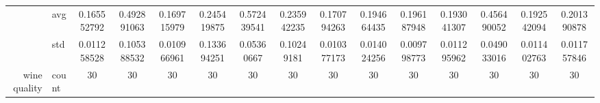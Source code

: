 \begin{table}[H]
{\begin{tabular}{rlccc|c|c|c|c|c|ccccc}
			                                                                               & avg                & \cellcolor[rgb]{ .388,  .745,  .482}\textcolor[rgb]{ 0,  .38,  0}{0.165552792} & \cellcolor[rgb]{ .98,  .522,  .443}0.492891063                                 & \cellcolor[rgb]{ .471,  .769,  .486}0.169715979                                & \cellcolor[rgb]{ 1,  .855,  .506}0.245419875    & \cellcolor[rgb]{ .973,  .412,  .42}0.572439541                                 & \cellcolor[rgb]{ 1,  .871,  .51}0.235942235     & \cellcolor[rgb]{ .49,  .773,  .486}0.170794263                                 & \cellcolor[rgb]{ .969,  .91,  .514}0.194664435  & \cellcolor[rgb]{ 1,  .922,  .518}0.196187948    & \cellcolor[rgb]{ .933,  .902,  .514}0.193041307 & \cellcolor[rgb]{ .984,  .573,  .451}0.456490052 & \cellcolor[rgb]{ .925,  .898,  .51}0.192542094  & \cellcolor[rgb]{ 1,  .918,  .518}0.201390878    \\
			                                                                               & std                & 0.011258528                                                                    & 0.105388532                                                                    & 0.010966961                                                                    & 0.133694251                                     & 0.05360667                                                                     & 0.10249181                                      & 0.010377173                                                                    & 0.014024256                                     & 0.009798773                                     & 0.011295962                                     & 0.049033016                                     & 0.011402763                                     & 0.011757846                                     \\
			wine quality                                                                   & count              & 30                                                                             & 30                                                                             & 30                                                                             & 30                                              & 30                                                                             & 30                                              & 30                                                                             & 30                                              & 30                                              & 30                                              & 30                                              & 30                                              & 30                                              \\

\end{tabular}}
\end{table}
